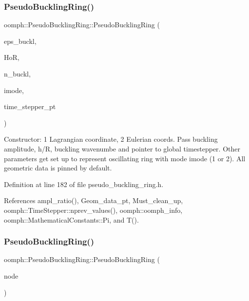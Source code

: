\subsubsection{\texorpdfstring{Pseudo\+Buckling\+Ring()}{PseudoBucklingRing()}\hspace{0.1cm}{\footnotesize\ttfamily [4/5]}}
{\footnotesize\ttfamily oomph\+::\+Pseudo\+Buckling\+Ring\+::\+Pseudo\+Buckling\+Ring (\begin{DoxyParamCaption}\item[{const double \&}]{eps\+\_\+buckl,  }\item[{const double \&}]{HoR,  }\item[{const unsigned \&}]{n\+\_\+buckl,  }\item[{const unsigned \&}]{imode,  }\item[{\hyperlink{classoomph_1_1TimeStepper}{Time\+Stepper} $\ast$}]{time\+\_\+stepper\+\_\+pt }\end{DoxyParamCaption})\hspace{0.3cm}{\ttfamily [inline]}}



Constructor\+: 1 Lagrangian coordinate, 2 Eulerian coords. Pass buckling amplitude, h/R, buckling wavenumbe and pointer to global timestepper. Other parameters get set up to represent oscillating ring with mode imode (1 or 2). All geometric data is pinned by default. 



Definition at line 182 of file pseudo\+\_\+buckling\+\_\+ring.\+h.



References ampl\+\_\+ratio(), Geom\+\_\+data\+\_\+pt, Must\+\_\+clean\+\_\+up, oomph\+::\+Time\+Stepper\+::nprev\+\_\+values(), oomph\+::oomph\+\_\+info, oomph\+::\+Mathematical\+Constants\+::\+Pi, and T().

\mbox{\label{classoomph_1_1PseudoBucklingRing_af9cc141bb4fdc08dc17e02a5af2b8d1c}} 
\subsubsection{\texorpdfstring{Pseudo\+Buckling\+Ring()}{PseudoBucklingRing()}\hspace{0.1cm}{\footnotesize\ttfamily [5/5]}}
{\footnotesize\ttfamily oomph\+::\+Pseudo\+Buckling\+Ring\+::\+Pseudo\+Buckling\+Ring (\begin{DoxyParamCaption}\item[{const \hyperlink{classoomph_1_1PseudoBucklingRing}{Pseudo\+Buckling\+Ring} \&}]{node }\end{DoxyParamCaption})\hspace{0.3cm}{\ttfamily [inline]}}



